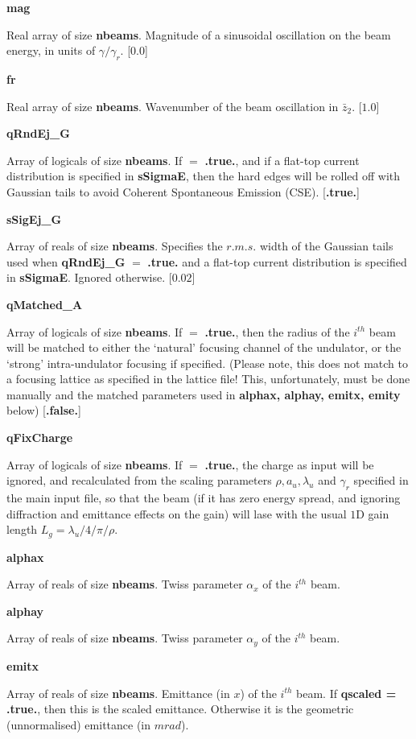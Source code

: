 \documentclass[12pt]{article}%
\begin{document}
{\bf mag}

Real array of size {\bf nbeams}. Magnitude of a sinusoidal oscillation on the beam energy, in units of $\gamma / \gamma_r$. [$0.0$]

{\bf fr}

Real array of size {\bf nbeams}. Wavenumber of the beam oscillation in $\bar{z}_2$. [$1.0$]


{\bf qRndEj\_G}

Array of logicals of size {\bf nbeams}. If $=$ {\bf .true.}, and if a flat-top current distribution is specified in {\bf sSigmaE}, then the hard edges will be rolled off with Gaussian tails to avoid Coherent Spontaneous Emission (CSE). [{\bf .true.}]

{\bf sSigEj\_G}

Array of reals of size {\bf nbeams}. Specifies the $r.m.s.$ width of the Gaussian tails used when {\bf qRndEj\_G} $=$ {\bf .true.} and a flat-top current distribution is specified in {\bf sSigmaE}. Ignored otherwise. [$0.02$]


{\bf qMatched\_A}

Array of logicals of size {\bf nbeams}. If $=$ {\bf .true.}, then the radius of the $i^{th}$ beam will be matched to either the `natural' focusing channel of the undulator, or the `strong' intra-undulator focusing if specified. (Please note, this does not match to a focusing lattice as specified in the lattice file! This, unfortunately, must be done manually and the matched parameters used in {\bf alphax, alphay, emitx, emity} below) [{\bf .false.}]

{\bf qFixCharge}

Array of logicals of size {\bf nbeams}. If $=$ {\bf .true.}, the charge as input will be ignored, and recalculated from the scaling parameters $\rho, a_u, \lambda_u$ and $\gamma_r$ specified in the main input file, so that the beam (if it has zero energy spread, and ignoring diffraction and emittance effects on the gain) will lase with the usual $1$D gain length $L_g = \lambda_u / 4 / \pi / \rho$.

{\bf alphax}

Array of reals of size {\bf nbeams}. Twiss parameter $\alpha_x$ of the $i^{th}$ beam.

{\bf alphay}

Array of reals of size {\bf nbeams}. Twiss parameter $\alpha_y$ of the $i^{th}$ beam.

{\bf emitx}

Array of reals of size {\bf nbeams}. Emittance (in $x$) of the $i^{th}$ beam. If {\bf qscaled = .true.}, then this is the scaled emittance. Otherwise it is the geometric (unnormalised) emittance (in $m rad$).
\end{document}
